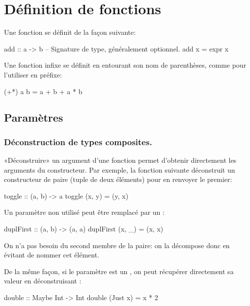 \section{Définition de fonctions}
\label{defining-functions}

Une fonction se définit de la façon suivante:

\begin{haskellcode}
add :: a -> b  -- Signature de type, généralement optionnel.
add x = expr x
\end{haskellcode}

Une fonction infixe se définit en entourant son nom de parenthèses, comme pour l'utiliser en préfixe:

\begin{haskellcode}
(+*) a b = a + b + a * b
\end{haskellcode}


\subsection{Paramètres}

\subsubsection{Déconstruction de types composites.}

«Déconstruire» un argument d'une fonction permet d'obtenir directement les arguments du constructeur. Par exemple, la fonction suivante déconstruit un constructeur de paire (tuple de deux éléments) pour en renvoyer le premier:

\begin{haskellcode}
toggle :: (a, b) -> a
toggle (x, y) = (y, x)
\end{haskellcode}

Un paramètre non utilisé peut être remplacé par un \hs{_}:

\begin{haskellcode}
duplFirst :: (a, b) -> (a, a)
duplFirst (x, _) = (x, x)
\end{haskellcode}

On n'a pas besoin du second membre de la paire: on la décompose donc en évitant de nommer cet élément.

De la même façon, si le paramètre est un , on peut récupérer directement sa valeur en déconstruisant :

\begin{haskellcode}
double :: Maybe Int -> Int
double (Just x) = x * 2
\end{haskellcode}

